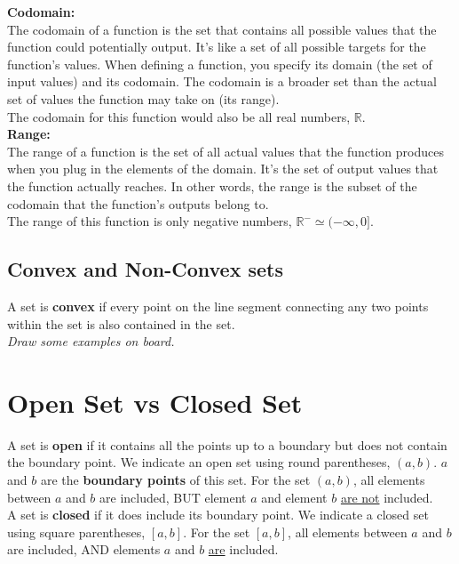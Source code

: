 \documentclass{article}
\begin{document}
\textbf{Codomain:}\\
The codomain of a function is the set that contains all possible values that the function could potentially output. It's like a set of all possible targets for the function's values. When defining a function, you specify its domain (the set of input values) and its codomain. The codomain is a broader set than the actual set of values the function may take on (its range).\\

The codomain for this function would also be all real numbers, $\mathbb{R}$.\\

\textbf{Range:}\\
The range of a function is the set of all actual values that the function produces when you plug in the elements of the domain. It's the set of output values that the function actually reaches. In other words, the range is the subset of the codomain that the function's outputs belong to.\\

The range of this function is only negative numbers, $\mathbb{R}^- \simeq (-\infty, 0]$.

\subsection{Convex and Non-Convex sets}
A set is \textbf{convex} if every point on the line segment connecting any two points within the set is also contained in the set.\\

\textit{Draw some examples on board.}


\section{Open Set vs Closed Set}

A set is \textbf{open} if it contains all the points up to a boundary but does not contain the boundary point. We indicate an open set using round parentheses, $(a,b)$. $a$ and $b$ are the \textbf{boundary points} of this set. For the set $(a,b)$, all elements between $a$ and $b$ are included, BUT element $a$ and element $b$ \underline{are not} included. \\

A set is \textbf{closed} if it does include its boundary point. We indicate a closed set using square parentheses, $[a, b]$. For the set $[a, b]$, all elements between $a$ and $b$ are included, AND elements $a$ and $b$ \underline{are} included. 
\end{document}
